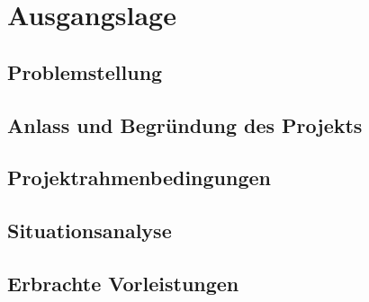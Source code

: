 \section{Ausgangslage}
\subsection{Problemstellung}
\subsection{Anlass und Begründung des Projekts}
\subsection{Projektrahmenbedingungen}
\subsection{Situationsanalyse}
\subsection{Erbrachte Vorleistungen}
